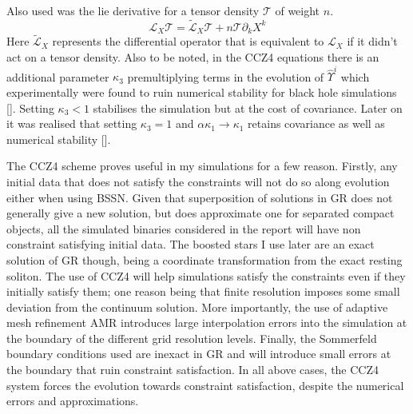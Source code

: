\documentclass[11pt, oneside]{report}  %
\renewcommand{\L}{\mathcal{L}}
\newcommand{\T}{\mathcal{T}}
\numberwithin{equation}{section}
\begin{document}
Also used was the lie derivative for a tensor density $\T$ of weight $n$.\begin{equation} \L_X \T = \widetilde{\L}_X \T + n\T \partial_k X^k\end{equation}
Here $ \widetilde{\L}_X$ represents the differential operator that is equivalent to $\L_X$ if it didn't act on a tensor density. Also to be noted, in the CCZ4 equations there is an additional parameter $\kappa_3$ premultiplying terms in the evolution of $\hat{\Upsilon}^i$ which experimentally were found to ruin numerical stability for black hole simulations []. Setting $\kappa_3<1$ stabilises the simulation but at the cost of covariance. Later on it was realised that setting $\kappa_3=1$ and $\alpha\kappa_1\rightarrow\kappa_1$ retains covariance as well as numerical stability [].

The CCZ4 scheme proves useful in my simulations for a few reason. Firstly, any initial data that does not satisfy the constraints will not do so along evolution either when using BSSN. Given that superposition of solutions in GR does not generally give a new solution, but does approximate one for separated compact objects, all the simulated binaries considered in the report will have non constraint satisfying initial data. The boosted stars I use later are an exact solution of GR though, being a coordinate transformation from the exact resting soliton. The use of CCZ4 will help simulations satisfy the constraints even if they initially satisfy them; one reason being that finite resolution imposes some small deviation from the continuum solution. More importantly, the use of adaptive mesh refinement AMR introduces large interpolation errors into the simulation at the boundary of the different grid resolution levels. Finally, the Sommerfeld boundary conditions used are inexact in GR and will introduce small errors at the boundary that ruin constraint satisfaction. In all above cases, the CCZ4 system forces the evolution towards constraint satisfaction, despite the numerical errors and approximations.
\end{document}
